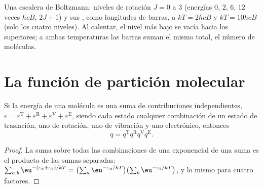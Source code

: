 \begin{omfigure}

{\small Una escalera de Boltzmann: niveles de rotación $J = 0$ a 3 (energías $0$, $2$, $6$,
$12$ veces $hcB$,  $2J + 1$) y sus , como longitudes de barras,
a $kT = 2hcB$ y $kT = 10hcB$ (solo los cuatro niveles). Al calentar, el nivel más bajo se
vacía hacia los superiores; a ambas temperaturas las barras suman
el mismo total, el número de moléculas.}
\end{omfigure}

\section{La función de partición molecular}

\begin{proposition}[Factorización]\label{prop:b3:partition-functions:factorisation}
Si la energía de una molécula es una suma de contribuciones independientes,
$\varepsilon = \varepsilon^{\mathrm T} + \varepsilon^{\mathrm R} + \varepsilon^{\mathrm V} + \varepsilon^{\mathrm E}$, siendo cada estado
cualquier combinación de un estado de traslación, uno de rotación, uno de vibración y uno
electrónico, entonces
\[
  q = q^{\mathrm T}q^{\mathrm R}q^{\mathrm V}q^{\mathrm E}.
\]
\end{proposition}

\begin{proof}
La suma sobre todas las combinaciones de una exponencial de una suma es el producto de las
sumas separadas: $\sum_{a,b}\eu^{-(\varepsilon_a+\varepsilon_b)/kT} = \bigl(\sum_a\eu^{-\varepsilon_a/kT}\bigr)
\bigl(\sum_b\eu^{-\varepsilon_b/kT}\bigr)$, y lo mismo para cuatro factores.
\end{proof}

